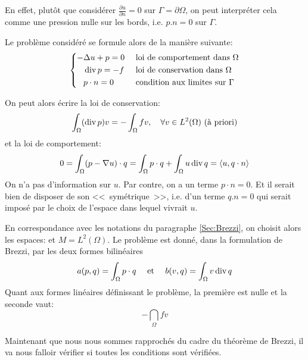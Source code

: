 En effet, plutôt que considérer $\frac{\partial u}{\partial n}=0$ sur $\Gamma=\partial\Omega$,
on peut interpréter cela comme une pression nulle sur les bords, i.e. $p.n=0$ sur $\Gamma$.

\medskip
Le problème considéré se formule alors de la manière suivante:
\begin{equation}\left\{
\begin{aligned}
-&\Delta u +p =0 && \text{ loi de comportement dans } \Omega\\
&\operatorname{div} p = -f && \text{ loi de conservation dans } \Omega\\
& p\cdot n=0 && \text{ condition aux limites sur }\Gamma
\end{aligned}
\right.
\end{equation}

On peut alors écrire la loi de conservation:
\begin{equation}
\displaystyle\int_\Omega (\operatorname{div} p) v = -\displaystyle\int_\Omega fv,\quad \forall v\in L^2(\Omega) \text{ (à priori)}
\end{equation}
et la loi de comportement:
\begin{equation}
0=\displaystyle\int_\Omega (p-\nabla u)\cdot q = \displaystyle\int_\Omega p\cdot q + \displaystyle\int_\Omega u \operatorname{div} q=\langle u,q\cdot n\rangle
\end{equation}
On n'a pas d'information sur $u$.
Par contre, on a un terme $p\cdot n=0$.
Et il serait bien de disposer de son <<~symétrique~>>, i.e. d'un terme $q.n=0$ qui serait imposé
par le choix de l'espace dans lequel vivrait $u$.

\medskip
En correspondance avec les notations du paragraphe \ref{Sec:Brezzi}, on choisit alors les espaces:
et $M=L^2(\Omega)$.
Le problème est donné, dans la formulation de Brezzi,
par les deux formes bilinéaires
\begin{equation}a(p,q)=\displaystyle\int_\Omega p\cdot q\quad\text{ et }\quad b(v,q)=\displaystyle\int_\Omega v\operatorname{div} q\end{equation}
Quant aux formes linéaires définissant le problème, la première est nulle et la
seconde vaut:\begin{equation}-\dint_\Omega fv\end{equation}

\medskip
Maintenant que nous nous sommes rapprochés du cadre du théorème de Brezzi,
il va nous falloir vérifier si toutes les conditions sont vérifiées.

